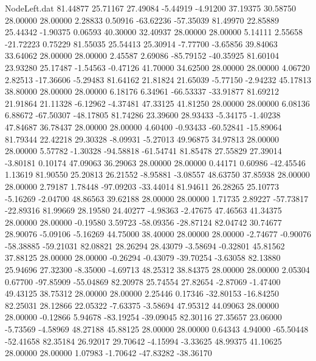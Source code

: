 \begin{filecontents}{NodeLeft.dat}
  81.44877   25.71167   27.49084    -5.44919   -4.91200   37.19375   30.58750   28.00000   28.00000    2.28833    0.50916  -63.62236  -57.35039
  81.49970   22.85889   25.44342    -1.90375    0.06593   40.30000   32.40937   28.00000   28.00000    5.14111    2.55658  -21.72223    0.75229
  81.55035   25.54413   25.30914    -7.77700   -3.65856   39.84063   33.64062   28.00000   28.00000    2.45587    2.69086  -85.79152  -40.35925
  81.60104   23.93280   25.17487    -1.54563   -0.47126   41.70000   34.62500   28.00000   28.00000    4.06720    2.82513  -17.36606   -5.29483
  81.64162   21.81824   21.65039    -5.77150   -2.94232   45.17813   38.80000   28.00000   28.00000    6.18176    6.34961  -66.53337  -33.91877
  81.69212   21.91864   21.11328    -6.12962   -4.37481   47.33125   41.81250   28.00000   28.00000    6.08136    6.88672  -67.50307  -48.17805
  81.74286   23.39600   28.93433    -5.34175   -1.40238   47.84687   36.78437   28.00000   28.00000    4.60400   -0.93433  -60.52841  -15.89064
  81.79344   22.42218   29.30328    -8.09931   -5.27013   49.96875   34.97813   28.00000   28.00000    5.57782   -1.30328  -94.58818  -61.54741
  81.85478   27.55829   27.39014    -3.80181    0.10174   47.09063   36.29063   28.00000   28.00000    0.44171    0.60986  -42.45546    1.13619
  81.90550   25.20813   26.21552    -8.95881   -3.08557   48.63750   37.85938   28.00000   28.00000    2.79187    1.78448  -97.09203  -33.44014
  81.94611   26.28265   25.10773    -5.16269   -2.04700   48.86563   39.62188   28.00000   28.00000    1.71735    2.89227  -57.73817  -22.89316
  81.99669   28.19580   24.40277    -4.98363   -2.47675   47.46563   41.34375   28.00000   28.00000   -0.19580    3.59723  -58.09356  -28.87124
  82.04742   30.74677   28.90076    -5.09106   -5.16269   44.75000   38.40000   28.00000   28.00000   -2.74677   -0.90076  -58.38885  -59.21031
  82.08821   28.26294   28.43079    -3.58694   -0.32801   45.81562   37.88125   28.00000   28.00000   -0.26294   -0.43079  -39.70254   -3.63058
  82.13880   25.94696   27.32300    -8.35000   -4.69713   48.25312   38.84375   28.00000   28.00000    2.05304    0.67700  -97.85909  -55.04869
  82.20978   25.74554   27.82654    -2.87069   -1.47400   49.43125   38.75312   28.00000   28.00000    2.25446    0.17346  -32.80153  -16.84250
  82.25031   28.12866   22.05322    -7.63375   -3.58694   47.95312   44.09063   28.00000   28.00000   -0.12866    5.94678  -83.19254  -39.09045
  82.30116   27.35657   23.06000    -5.73569   -4.58969   48.27188   45.88125   28.00000   28.00000    0.64343    4.94000  -65.50448  -52.41658
  82.35184   26.92017   29.70642    -4.15994   -3.33625   48.99375   41.10625   28.00000   28.00000    1.07983   -1.70642  -47.83282  -38.36170

\end{filecontents}
